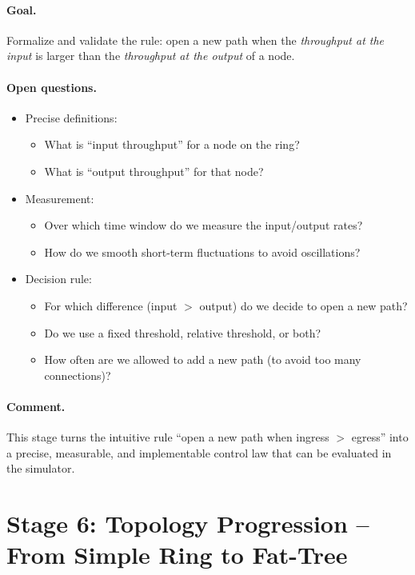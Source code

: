 \documentclass[12pt]{article}
\begin{document}
\paragraph{Goal.}
Formalize and validate the rule: open a new path when the \emph{throughput at the input} is larger than the \emph{throughput at the output} of a node.

\paragraph{Open questions.}
\begin{itemize}[leftmargin=*]
  \item Precise definitions:
        \begin{itemize}
            \item What is ``input throughput'' for a node on the ring?
            \item What is ``output throughput'' for that node?
        \end{itemize}
  \item Measurement:
        \begin{itemize}
            \item Over which time window do we measure the input/output rates?
            \item How do we smooth short-term fluctuations to avoid oscillations?
        \end{itemize}
  \item Decision rule:
        \begin{itemize}
            \item For which difference (input $>$ output) do we decide to open a new path?
            \item Do we use a fixed threshold, relative threshold, or both?
            \item How often are we allowed to add a new path (to avoid too many connections)?
        \end{itemize}
\end{itemize}

\paragraph{Comment.}
This stage turns the intuitive rule ``open a new path when ingress $>$ egress'' into a precise, measurable, and implementable control law that can be evaluated in the simulator.

\newpage
\section*{Stage 6: Topology Progression -- From Simple Ring to Fat-Tree}
\end{document}
